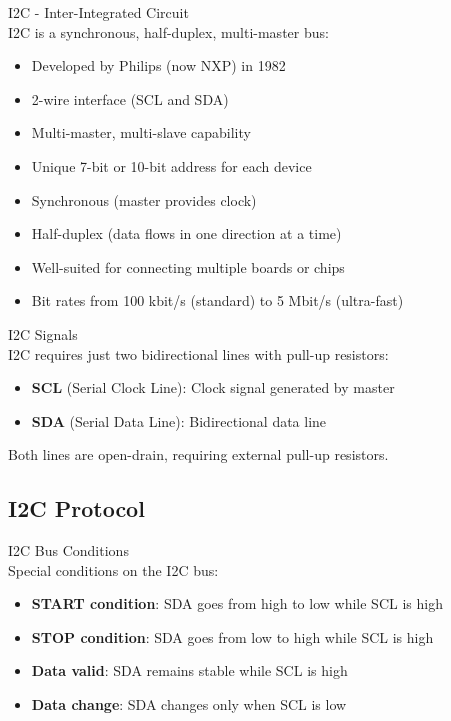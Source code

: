 \begin{concept}{I2C - Inter-Integrated Circuit}\\
I2C is a synchronous, half-duplex, multi-master bus:
\begin{itemize}
    \item Developed by Philips (now NXP) in 1982
    \item 2-wire interface (SCL and SDA)
    \item Multi-master, multi-slave capability
    \item Unique 7-bit or 10-bit address for each device
    \item Synchronous (master provides clock)
    \item Half-duplex (data flows in one direction at a time)
    \item Well-suited for connecting multiple boards or chips
    \item Bit rates from 100 kbit/s (standard) to 5 Mbit/s (ultra-fast)
\end{itemize}
\end{concept}

\begin{definition}{I2C Signals}\\
I2C requires just two bidirectional lines with pull-up resistors:
\begin{itemize}
    \item \textbf{SCL} (Serial Clock Line): Clock signal generated by master
    \item \textbf{SDA} (Serial Data Line): Bidirectional data line
\end{itemize}
Both lines are open-drain, requiring external pull-up resistors.
\end{definition}

\subsection{I2C Protocol}

\begin{concept}{I2C Bus Conditions}\\
Special conditions on the I2C bus:
\begin{itemize}
    \item \textbf{START condition}: SDA goes from high to low while SCL is high
    \item \textbf{STOP condition}: SDA goes from low to high while SCL is high
    \item \textbf{Data valid}: SDA remains stable while SCL is high
    \item \textbf{Data change}: SDA changes only when SCL is low
\end{itemize}
\end{concept}

